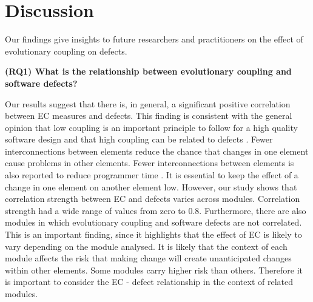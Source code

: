 \documentclass[times]{smrauth}
\begin{document}
\section{Discussion}

Our findings give insights to future researchers and practitioners on
the effect of evolutionary coupling on  defects.


\textbf{(RQ1) What is the relationship between evolutionary coupling and software defects?} 

Our results suggest that there is, in general, a significant positive correlation between EC measures and defects. This finding is consistent with the general opinion that low coupling is an important principle to follow for a high quality software design and that high coupling can be related to defects \cite{briand1999unified} \cite{briand2000exploring} \cite{baldwin2000design}. Fewer interconnections between elements reduce the chance that changes in one element cause problems in other elements. Fewer interconnections between elements is also reported to reduce programmer time \cite{harrold2003software}. It is essential to keep the effect of a change in one element on another element low. However, our study shows that correlation strength between EC and defects varies across modules. Correlation strength had a wide range of values from zero to 0.8. Furthermore, there are also modules in which evolutionary coupling and software defects are not correlated. This is an important finding, since it highlights that the effect of EC is likely to vary depending on the module analysed. It is likely that the context of each module affects the risk that making change will create unanticipated changes within other elements. Some modules carry higher risk than others. Therefore it is important to consider the EC - defect relationship in the context of related modules.
\end{document}
